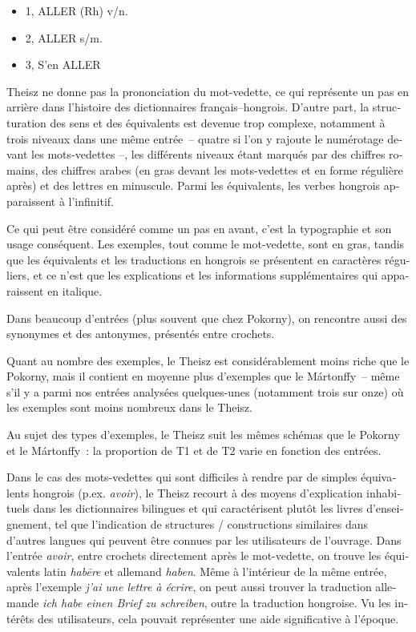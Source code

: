 \documentclass[output=paper,colorlinks,citecolor=brown,arabicfont,chinesefont,booklanguage=french]{langscibook}
\begin{document}
\begin{otherlanguage}{french}
\begin{itemize}
    \item 1, ALLER (Rh) v/n.
    \item 2, ALLER s/m.
    \item 3, S’en ALLER
\end{itemize}

Theisz ne donne pas la prononciation du mot-vedette, ce qui représente un pas en arrière dans l’histoire des dictionnaires français–hongrois. D’autre part, la structuration des sens et des équivalents est devenue trop complexe, notamment à trois niveaux dans une même entrée~-- quatre si l’on y rajoute le numérotage devant les mots-vedettes –, les différents niveaux étant marqués par des chiffres romains, des chiffres arabes (en gras devant les mots-vedettes et en forme régulière après) et des lettres en minuscule. Parmi les équivalents, les verbes hongrois apparaissent à l’infinitif. 

Ce qui peut être considéré comme un pas en avant, c’est la typographie et son usage conséquent. Les exemples, tout comme le mot-vedette, sont en gras, tandis que les équivalents et les traductions en hongrois se présentent en caractères réguliers, et ce n’est que les explications et les informations supplémentaires qui apparaissent en italique.

Dans beaucoup d’entrées (plus souvent que chez Pokorny), on rencontre aussi des synonymes et des antonymes, présentés entre crochets. 

Quant au nombre des exemples, le Theisz est considérablement moins riche que le Pokorny, mais il contient en moyenne plus d’exemples que le Mártonffy~-- même s’il y a parmi nos entrées analysées quelques-unes (notamment trois sur onze) où les exemples sont moins nombreux dans le Theisz. 

Au sujet des types d’exemples, le Theisz suit les mêmes schémas que le Pokorny et le Mártonffy~: la proportion de T1 et de T2 varie en fonction des entrées.

Dans le cas des mots-vedettes qui sont difficiles à rendre par de simples équivalents hongrois (p.ex. \emph{avoir}), le Theisz recourt à des moyens d’explication inhabituels dans les dictionnaires bilingues et qui caractérisent plutôt les livres d’enseignement, tel que l’indication de structures / constructions similaires dans d’autres langues qui peuvent être connues par les utilisateurs de l’ouvrage. Dans l’entrée \emph{avoir}, entre crochets directement après le mot-vedette, on trouve les équivalents latin \emph{habēre} et allemand \emph{haben}. Même à l’intérieur de la même entrée, après l’exemple \emph{j’ai une lettre à écrire}, on peut aussi trouver la traduction allemande \emph{ich habe einen Brief zu schreiben}, outre la traduction hongroise. Vu les intérêts des utilisateurs, cela pouvait représenter une aide significative à l’époque.


\end{otherlanguage}
\end{document}
